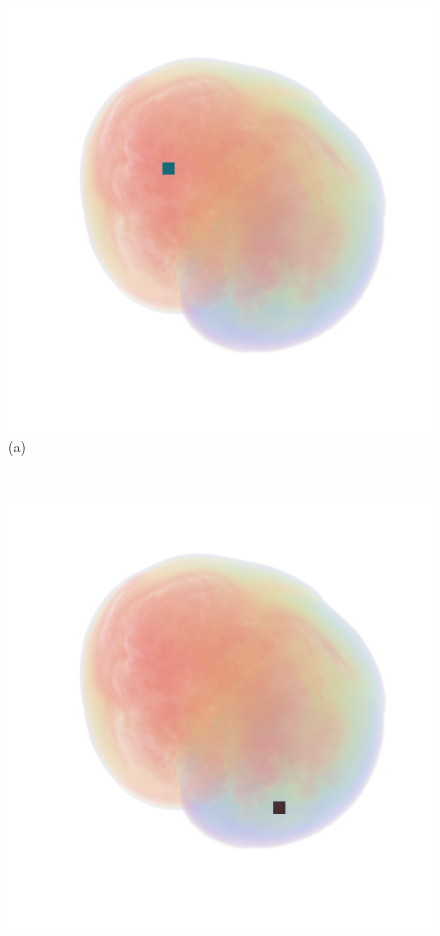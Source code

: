 \documentclass[twoside,twocolumn,10pt]{article}
\begin{document}
\begin{figure}
	\centering
	\begin{minipage}{.16\textwidth}
		\centering
		\includegraphics[width=1\linewidth]{crop/supernova_selection_red}
		(a)
	\end{minipage}~
	\begin{minipage}{.16\textwidth}
		\centering
		\includegraphics[width=1\linewidth]{crop/supernova_selection_green}

\end{minipage}
\end{figure}
\end{document}
